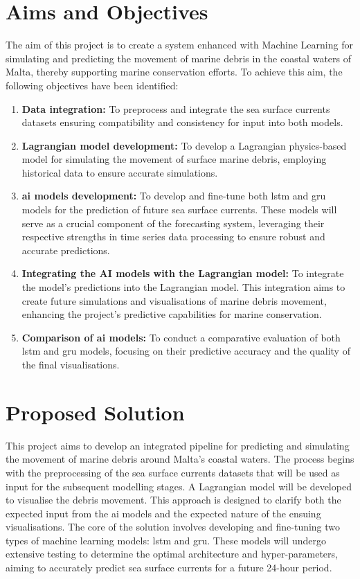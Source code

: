 \section{Aims and Objectives}
\label{sec:aims_and_objectives}
The aim of this project is to create a system enhanced with Machine Learning for simulating and predicting the movement of marine debris in the coastal waters of Malta, thereby supporting marine conservation efforts. To achieve this aim, the following objectives have been identified:
\begin{enumerate}[label=\textbf{0\arabic*.}] %
    \item \textbf{Data integration:} To preprocess and integrate the sea surface currents datasets ensuring compatibility and consistency for input into both models.
    \item \textbf{Lagrangian model development:} To develop a Lagrangian physics-based model for simulating the movement of surface marine debris, employing historical data to ensure accurate simulations.
    \item \textbf{\acrshort{ai} models development:} To develop and fine-tune both \acrshort{lstm} and \acrshort{gru} models for the prediction of future sea surface currents. These models will serve as a crucial component of the forecasting system, leveraging their respective strengths in time series data processing to ensure robust and accurate predictions.
    \item \textbf{Integrating the AI models with the Lagrangian model:} To integrate the model’s predictions into the Lagrangian model. This integration aims to create future simulations and visualisations of marine debris movement, enhancing the project’s predictive capabilities for marine conservation.
    \item \textbf{Comparison of \acrshort{ai} models:} To conduct a comparative evaluation of both \acrshort{lstm} and \acrshort{gru} models, focusing on their predictive accuracy and the quality of the final visualisations.
\end{enumerate}

\section{Proposed Solution}
\label{sec:proposed_solution}
This project aims to develop an integrated pipeline for predicting and simulating the movement of marine debris around Malta's coastal waters. The process begins with the preprocessing of the sea surface currents datasets that will be used as input for the subsequent modelling stages. A Lagrangian model will be developed to visualise the debris movement. This approach is designed to clarify both the expected input from the \acrshort{ai} models and the expected nature of the ensuing visualisations. The core of the solution involves developing and fine-tuning two types of machine learning models: \acrshort{lstm} and \acrshort{gru}. These models will undergo extensive testing to determine the optimal architecture and hyper-parameters, aiming to accurately predict sea surface currents for a future 24-hour period. 


